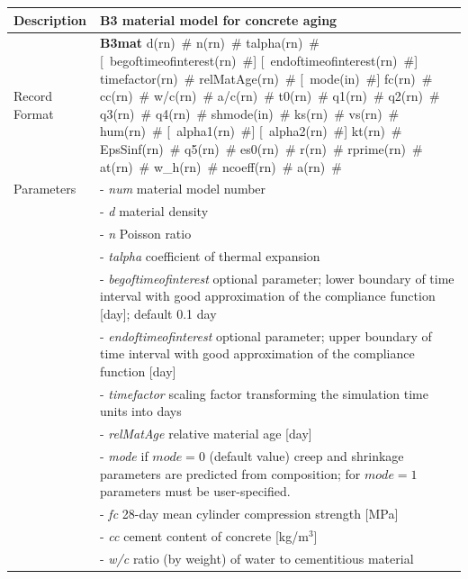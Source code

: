 \documentclass[a4paper]{article}
\newcommand{\descitem}[1]{{\noindent \bf #1}}
\newcommand{\elemparam}[2]{{{#1\tiny (#2)}~\#}}
\newcommand{\optelemparam}[2]{[{~\elemparam{#1}{#2}}]}
\newcommand{\param}[1]{{\it #1}}
\newenvironment{mmt}{\begin{tabular}{|l|p{9cm}|}}{\end{tabular}\\}
\newenvironment{mmt}{\begin{tabular}{|l|l|}}{\end{tabular}\\}
\begin{document}
\begin{table}[!htb]
\begin{mmt}
\hline
Description & B3 material model  for concrete aging\\
\hline
Record Format & \descitem{B3mat}  \elemparam{d}{rn} \elemparam{n}{rn}
\elemparam{talpha}{rn} 
\optelemparam{begoftimeofinterest}{rn} \optelemparam{endoftimeofinterest}{rn} \elemparam{timefactor}{rn} \elemparam{relMatAge}{rn}
%
\optelemparam{mode}{in} 
\elemparam{fc}{rn} \elemparam{cc}{rn} \elemparam{w/c}{rn}
\elemparam{a/c}{rn} \elemparam{t0}{rn}
\elemparam{q1}{rn} \elemparam{q2}{rn} \elemparam{q3}{rn}
\elemparam{q4}{rn}
%
\elemparam{shmode}{in}
\elemparam{ks}{rn} \elemparam{vs}{rn} \elemparam{hum}{rn}
\optelemparam{alpha1}{rn} \optelemparam{alpha2}{rn} 
\elemparam{kt}{rn} \elemparam{EpsSinf}{rn} \elemparam{q5}{rn}
\elemparam{es0}{rn} \elemparam{r}{rn} \elemparam{rprime}{rn}
\elemparam{at}{rn}  
\elemparam{w\_h}{rn} \elemparam{ncoeff}{rn} \elemparam{a}{rn}
\\
Parameters &- \param{num} material model number\\
%
&- \param{d} material density\\
&- \param{n} Poisson ratio\\
&- \param{talpha} coefficient of thermal expansion\\
&- \param{begoftimeofinterest} optional parameter; lower boundary of
time interval with good approximation of the compliance function
[day]; default 0.1 day\\
&- \param{endoftimeofinterest} optional parameter; upper boundary of
time interval with good approximation of the compliance function
[day]\\
&- \param{timefactor} scaling factor transforming the simulation time units into days\\
&- \param{relMatAge} relative material age [day]\\
%
&- \param{mode} if $mode = 0$ (default value) creep and shrinkage parameters are
predicted from composition; for $mode = 1$ parameters must be user-specified.\\
&- \param{fc} 28-day mean cylinder compression strength [MPa]\\
&- \param{cc} cement content of concrete [kg/m$^{3}$]\\
&- \param{w/c} ratio (by weight) of water to cementitious material\\

\end{mmt}
\end{table}
\end{document}
